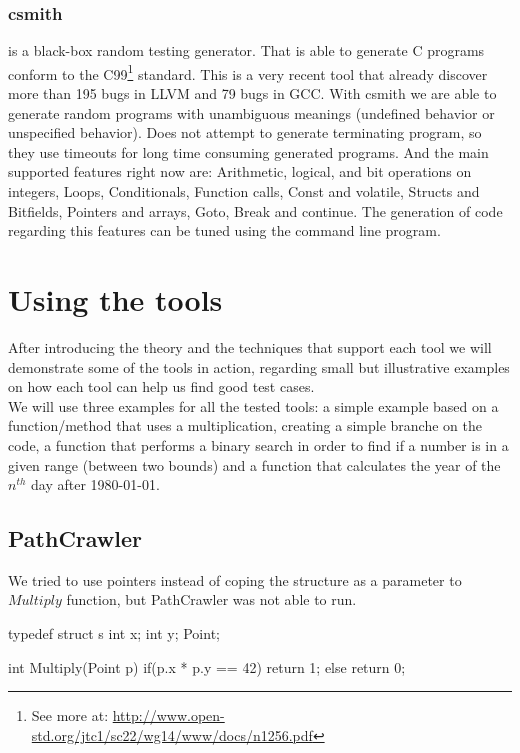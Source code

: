 \documentclass[10pt, conference, compsocconf]{IEEEtran}
\begin{document}
\subsubsection{\textbf{csmith}\cite{Yang:2011:FUB:1993316.1993532}} is a black-box random testing generator. That is able to generate C programs
conform to the C99\footnote{See more at: \url{http://www.open-std.org/jtc1/sc22/wg14/www/docs/n1256.pdf}} standard. This is a very recent tool that already discover
more than 195 bugs in LLVM and 79 bugs in GCC. With csmith we are able to generate random programs with unambiguous meanings (undefined behavior or 
unspecified behavior). Does not attempt to generate terminating program, so they use timeouts for long time consuming generated programs.
And the main supported features right now are: Arithmetic, logical, and bit operations on integers, Loops, Conditionals, Function calls, Const and volatile,
Structs and Bitfields, Pointers and arrays, Goto, Break and continue. The generation of code regarding this features can be tuned using the command line program.

\section{Using the tools}\label{testingtools}
After introducing the theory and the techniques that support each tool we will demonstrate some of the tools in action, regarding small but illustrative examples
on how each tool can help us find good test cases.\\
We will use three examples for all the tested tools: a simple example based on a function/method that uses a multiplication, creating a simple branche on the code,
a function that performs a binary search in order to find if a number is in a given range (between two bounds)
and a function that calculates the year of the $n^{th}$ day after 1980-01-01.

\subsection{PathCrawler}
We tried to use pointers instead of coping the structure as a parameter to $Multiply$ function, but PathCrawler was not able to run.
\begin{code}
typedef struct s {
    int x;
    int y;
}Point;

int Multiply(Point p) {
    if(p.x * p.y == 42) return 1;
    else return 0;
}
\end{code}
\end{document}
